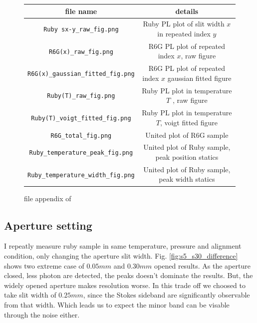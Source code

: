 \documentclass{article}
\begin{document}
\begin{figure}[H]
  \centering
  \begin{tabular}{|c| c|}
      file name  & details \\
      \hline
      \verb|Ruby sx-y_raw_fig.png| & Ruby PL plot of slit width $x$ in repeated index $y$\\
      \verb|R6G(x)_raw_fig.png| & R6G PL plot of repeated index $x$, raw figure\\
      \verb|R6G(x)_gaussian_fitted_fig.png| & R6G PL plot of repeated index $x$ gaussian fitted figure\\
      \verb|Ruby(T)_raw_fig.png| & Ruby PL plot in temperature $T$ , raw  figure\\
      \verb|Ruby(T)_voigt_fitted_fig.png| & Ruby PL plot in temperature $T$, voigt fitted figure\\
      \verb|R6G_total_fig.png| & United plot of R6G sample\\
      \verb|Ruby_temperature_peak_fig.png| & United plot of Ruby sample, peak position statics\\
      \verb|Ruby_temperature_width_fig.png| & United plot of Ruby sample, peak width statics\\

  \end{tabular}
  \caption{file appendix of \cite{github_results}}
  \label{fig:file_appendix}
\end{figure}

\subsection{Aperture setting}
\label{result:aperture_effect}
 I repeatly measure ruby sample in same temperature, pressure and alignment condition, only changing the aperture slit width.
 Fig. \ref{fig:s5_s30_difference} shows two extreme case of $0.05 mm$ and $0.30 mm$ opened results.
 As the aperture closed, less photon are detected, the peaks doesn't dominate the results.
 But, the widely opened aperture makes resolution worse.
 In this trade off we choosed to take slit width of $0.25 mm$, since the Stokes sideband are significantly observable from that width.
 Which leads us to expect the minor band can be visable through the noise either.
 
\end{document}
